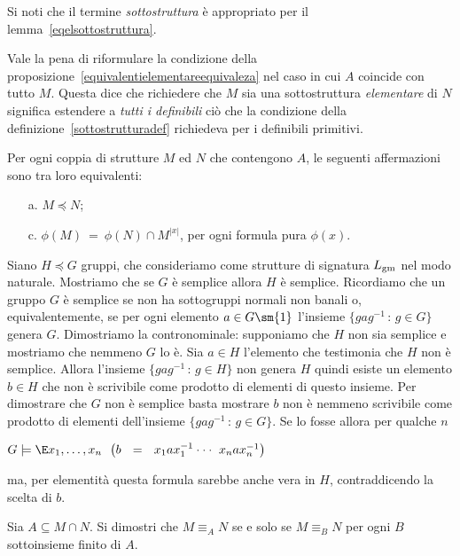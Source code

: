 Si noti che il termine \textit{sottostruttura\/} \`e appropriato per il lemma~\ref{eqelsottostruttura}.

Vale la pena di riformulare la condizione  della proposizione~\ref{equivalentielementareequivaleza} nel caso in cui $A$ coincide con tutto $M$. Questa dice che richiedere che $M$ sia una sottostruttura \textit{elementare\/} di $N$ significa estendere a \textit{tutti i definibili\/} ci\`o che la condizione  della definizione~\ref{sottostrutturadef} richiedeva per i definibili primitivi.

\begin{proposition}\label{equivalentielementareequivaleza2}
Per ogni coppia di strutture $M$ ed $N$ che contengono $A$, le seguenti affermazioni sono tra loro equivalenti:
\begin{itemize}
\item[a.] $M\preceq N$;
\item[c.] $\phi(M)\ =\ \phi(N) \cap M^{|x|}$,\hspace{4ex} per ogni formula pura $\phi(x)$.\QED
\end{itemize}
\end{proposition}


\begin{example}
Siano $H\preceq G$ gruppi, che consideriamo come strutture di signatura $L_{\rm gm}$ nel modo naturale. Mostriamo che se $G$ \`e semplice allora $H$ \`e semplice. Ricordiamo che un gruppo $G$ \`e semplice se non ha sottogruppi normali non banali o, equivalentemente, se per ogni elemento $a\in G\sm \{1\}$ l'insieme $\{gag^{-1}\,:\,g\in G\}$ genera $G$. Dimostriamo la contronominale: supponiamo che $H$ non sia semplice e mostriamo che nemmeno $G$ lo \`e. Sia $a\in H$ l'elemento che testimonia che $H$ non \`e semplice. Allora l'insieme $\{gag^{-1}\,:\,g\in H\}$ non genera $H$ quindi esiste un elemento $b\in H$ che non \`e scrivibile come prodotto di elementi di questo insieme. Per dimostrare che $G$ non \`e semplice basta mostrare $b$ non \`e nemmeno scrivibile come prodotto di elementi dell'insieme  $\{gag^{-1}\,:\,g\in G\}$. Se lo fosse allora per qualche $n$

\hfil$G\models \E x_1,\dots,x_n\ \ \big(b\ \ =\ \ x_1ax_1^{-1}\cdot\cdot\cdot\ x_nax_n^{-1}\big)$

ma, per elementit\`a questa formula sarebbe anche vera in $H$, contraddicendo la scelta di $b$. 
\end{example}

\begin{exercise}\label{finitanaturaeqel}
Sia $A\subseteq M\cap N$. Si dimostri che $M\equiv_A N$ se e solo se $M\equiv_B N$ per ogni $B$ sottoinsieme finito di $A$.\QED
\end{exercise}

